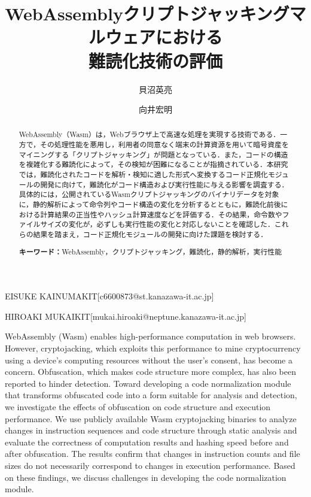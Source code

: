 \documentclass[submit,techrep]{ipsj}
\begin{document}
\title{WebAssemblyクリプトジャッキングマルウェアにおける\\難読化技術の評価}
\author{貝沼英亮}{EISUKE KAINUMA}{KIT}[c6600873@st.kanazawa-it.ac.jp]
\author{向井宏明}{HIROAKI MUKAI}{KIT}[mukai.hiroaki@neptune.kanazawa-it.ac.jp]
\begin{abstract}
WebAssembly（Wasm）は，Webブラウザ上で高速な処理を実現する技術である．一方で，その処理性能を悪用し，利用者の同意なく端末の計算資源を用いて暗号資産をマイニングする「クリプトジャッキング」が問題となっている．また，コードの構造を複雑化する難読化によって，その検知が困難になることが指摘されている．本研究では，難読化されたコードを解析・検知に適した形式へ変換するコード正規化モジュールの開発に向けて，難読化がコード構造および実行性能に与える影響を調査する．具体的には，公開されているWasmクリプトジャッキングのバイナリデータを対象に，静的解析によって命令列やコード構造の変化を分析するとともに，難読化前後における計算結果の正当性やハッシュ計算速度などを評価する．その結果，命令数やファイルサイズの変化が，必ずしも実行性能の変化と対応しないことを確認した．これらの結果を踏まえ，コード正規化モジュールの開発に向けた課題を検討する．
\par\smallskip
\noindent\textbf{\gtfamily キーワード：}WebAssembly，クリプトジャッキング，難読化，静的解析，実行性能
\end{abstract}
\begin{eabstract}
WebAssembly (Wasm) enables high-performance computation in web browsers. However, cryptojacking, which exploits this performance to mine cryptocurrency using a device's computing resources without the user's consent, has become a concern. Obfuscation, which makes code structure more complex, has also been reported to hinder detection. Toward developing a code normalization module that transforms obfuscated code into a form suitable for analysis and detection, we investigate the effects of obfuscation on code structure and execution performance. We use publicly available Wasm cryptojacking binaries to analyze changes in instruction sequences and code structure through static analysis and evaluate the correctness of computation results and hashing speed before and after obfuscation. The results confirm that changes in instruction counts and file sizes do not necessarily correspond to changes in execution performance. Based on these findings, we discuss challenges in developing the code normalization module.
\end{eabstract}
\maketitle
\end{document}

